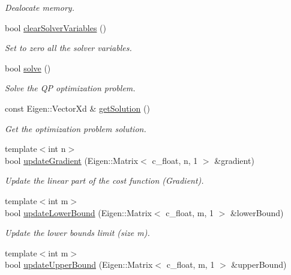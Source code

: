 \begin{DoxyCompactItemize}
\begin{DoxyCompactList}\small\item\em Dealocate memory. \end{DoxyCompactList}\item 
bool \mbox{\hyperlink{classOsqpEigen_1_1Solver_a11605685ef645c991b1f7935d1b854f4}{clear\+Solver\+Variables}} ()
\begin{DoxyCompactList}\small\item\em Set to zero all the solver variables. \end{DoxyCompactList}\item 
bool \mbox{\hyperlink{classOsqpEigen_1_1Solver_aade83b0e68b85d47d41a054f04d413aa}{solve}} ()
\begin{DoxyCompactList}\small\item\em Solve the QP optimization problem. \end{DoxyCompactList}\item 
const Eigen\+::\+Vector\+Xd \& \mbox{\hyperlink{classOsqpEigen_1_1Solver_a192a5f94034d4e467c6b557c2e06dd66}{get\+Solution}} ()
\begin{DoxyCompactList}\small\item\em Get the optimization problem solution. \end{DoxyCompactList}\item 
{\footnotesize template$<$int n$>$ }\\bool \mbox{\hyperlink{classOsqpEigen_1_1Solver_a7d1d9fdd8db3201a0ca2dcafbc289eea}{update\+Gradient}} (Eigen\+::\+Matrix$<$ c\+\_\+float, n, 1 $>$ \&gradient)
\begin{DoxyCompactList}\small\item\em Update the linear part of the cost function (Gradient). \end{DoxyCompactList}\item 
{\footnotesize template$<$int m$>$ }\\bool \mbox{\hyperlink{classOsqpEigen_1_1Solver_a48764153cec5e618021ab79586cc71b6}{update\+Lower\+Bound}} (Eigen\+::\+Matrix$<$ c\+\_\+float, m, 1 $>$ \&lower\+Bound)
\begin{DoxyCompactList}\small\item\em Update the lower bounds limit (size m). \end{DoxyCompactList}\item 
{\footnotesize template$<$int m$>$ }\\bool \mbox{\hyperlink{classOsqpEigen_1_1Solver_a69f1db45e10dae9c186cc0561532f018}{update\+Upper\+Bound}} (Eigen\+::\+Matrix$<$ c\+\_\+float, m, 1 $>$ \&upper\+Bound)

\end{DoxyCompactItemize}
